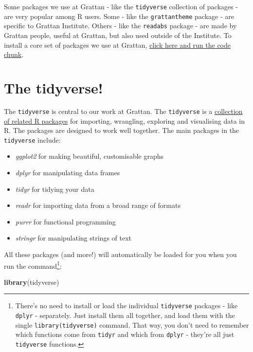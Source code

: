 \documentclass[
]{book}
\newenvironment{Shaded}{\begin{snugshade}}{\end{snugshade}}
\newcommand{\KeywordTok}[1]{\textcolor[rgb]{0.13,0.29,0.53}{\textbf{#1}}}
\newcommand{\NormalTok}[1]{#1}
\providecommand{\tightlist}{%
  \setlength{\itemsep}{0pt}\setlength{\parskip}{0pt}}
\begin{document}
Some packages we use at Grattan - like the \texttt{tidyverse} collection of packages - are very popular among R users. Some - like the \texttt{grattantheme} package - are specific to Grattan Institute. Others - like the \texttt{readabs} package - are made by Grattan people, useful at Grattan, but also used outside of the Institute. To install a core set of packages we use at Grattan, \protect\hyperlink{install-grattan-packages}{click here and run the code chunk}.

\hypertarget{tidyverse}{%
\section{The tidyverse!}\label{tidyverse}}

The \texttt{tidyverse} is central to our work at Grattan. The \texttt{tidyverse} is a \href{https://www.tidyverse.org/packages/}{collection of related R packages} for importing, wrangling, exploring and visualising data in R. The packages are designed to work well together.
The main packages in the \texttt{tidyverse} include:

\begin{itemize}
\tightlist
\item
  \emph{ggplot2} for making beautiful, customisable graphs
\item
  \emph{dplyr} for manipulating data frames
\item
  \emph{tidyr} for tidying your data
\item
  \emph{readr} for importing data from a broad range of formats
\item
  \emph{purrr} for functional programming
\item
  \emph{stringr} for manipulating strings of text
\end{itemize}

All these packages (and more!) will automatically be loaded for you when you run the command\footnote{There's no need to install or load the individual \texttt{tidyverse} packages - like \texttt{dplyr} - separately. Just install them all together, and load them with the single \texttt{library(tidyverse)} command. That way, you don't need to remember which functions come from \texttt{tidyr} and which from \texttt{dplyr} - they're all just \texttt{tidyverse} functions.}:

\begin{Shaded}
\begin{Highlighting}[]
\KeywordTok{library}\NormalTok{(tidyverse)}
\end{Highlighting}
\end{Shaded}
\end{document}
